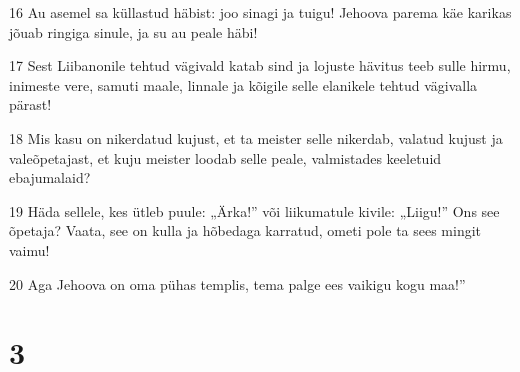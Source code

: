\par 16 Au asemel sa küllastud häbist: joo sinagi ja tuigu! Jehoova parema käe karikas jõuab ringiga sinule, ja su au peale häbi!
\par 17 Sest Liibanonile tehtud vägivald katab sind ja lojuste hävitus teeb sulle hirmu, inimeste vere, samuti maale, linnale ja kõigile selle elanikele tehtud vägivalla pärast!
\par 18 Mis kasu on nikerdatud kujust, et ta meister selle nikerdab, valatud kujust ja valeõpetajast, et kuju meister loodab selle peale, valmistades keeletuid ebajumalaid?
\par 19 Häda sellele, kes ütleb puule: „Ärka!” või liikumatule kivile: „Liigu!” Ons see õpetaja? Vaata, see on kulla ja hõbedaga karratud, ometi pole ta sees mingit vaimu!
\par 20 Aga Jehoova on oma pühas templis, tema palge ees vaikigu kogu maa!”


\chapter{3}

